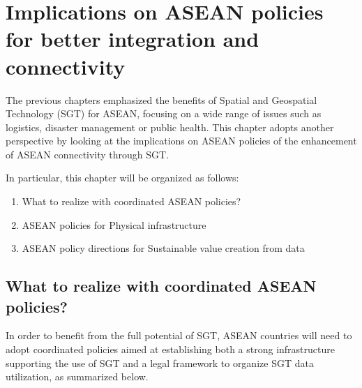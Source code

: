 \chapter{Implications on ASEAN policies for better integration and connectivity}

\tab The previous chapters emphasized the benefits of Spatial and Geospatial Technology (SGT) for ASEAN, focusing on a wide range of issues such as logistics, disaster management or public health. This chapter adopts another perspective by looking at the implications on ASEAN policies of the enhancement of ASEAN connectivity through SGT.

\vspace{0.4 cm}

In particular, this chapter will be organized as follows:

\begin{enumerate}

\item What to realize with coordinated ASEAN policies?

\item ASEAN policies for Physical infrastructure

\item ASEAN policy directions for Sustainable value creation from data 

\end{enumerate}


\section{What to realize with coordinated ASEAN policies?}

\tab In order to benefit from the full potential of SGT, ASEAN countries will need to adopt coordinated policies aimed at establishing both a strong infrastructure supporting the use of SGT and a legal framework to organize SGT data utilization, as summarized below.

